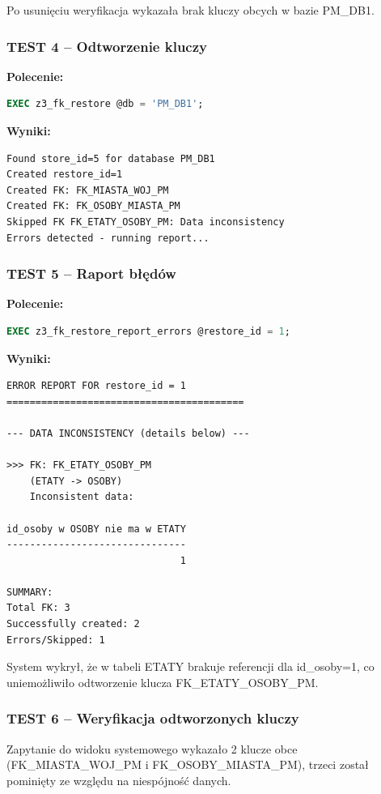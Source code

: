 \documentclass[a4paper,11pt]{article}
\begin{document}
	Po usunięciu weryfikacja wykazała brak kluczy obcych w bazie PM\_DB1.
	
	\subsubsection{TEST 4 -- Odtworzenie kluczy}
	
	\textbf{Polecenie:}
	\begin{lstlisting}[language=SQL]
EXEC z3_fk_restore @db = 'PM_DB1';
	\end{lstlisting}
	
	\textbf{Wyniki:}
	\begin{lstlisting}
Found store_id=5 for database PM_DB1
Created restore_id=1
Created FK: FK_MIASTA_WOJ_PM
Created FK: FK_OSOBY_MIASTA_PM
Skipped FK FK_ETATY_OSOBY_PM: Data inconsistency
Errors detected - running report...
	\end{lstlisting}
	
	\subsubsection{TEST 5 -- Raport błędów}
	
	\textbf{Polecenie:}
	\begin{lstlisting}[language=SQL]
EXEC z3_fk_restore_report_errors @restore_id = 1;
	\end{lstlisting}
	
	\textbf{Wyniki:}
	\begin{lstlisting}
ERROR REPORT FOR restore_id = 1
=========================================

--- DATA INCONSISTENCY (details below) ---

>>> FK: FK_ETATY_OSOBY_PM
    (ETATY -> OSOBY)
    Inconsistent data:

id_osoby w OSOBY nie ma w ETATY
-------------------------------
                              1

SUMMARY:
Total FK: 3
Successfully created: 2
Errors/Skipped: 1
	\end{lstlisting}
	
	System wykrył, że w tabeli ETATY brakuje referencji dla id\_osoby=1, co uniemożliwiło odtworzenie klucza FK\_ETATY\_OSOBY\_PM.
	
	\subsubsection{TEST 6 -- Weryfikacja odtworzonych kluczy}
	
	Zapytanie do widoku systemowego wykazało 2 klucze obce (FK\_MIASTA\_WOJ\_PM i FK\_OSOBY\_MIASTA\_PM), trzeci został pominięty ze względu na niespójność danych.
	
\end{document}
